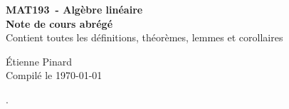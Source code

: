 \documentclass[11pt]{article}
\theoremstyle{plain}
\theoremstyle{definition}
\theoremstyle{remark}
\begin{document}
\shorthandoff{:}

\begin{titlepage}
    \centering
    \vspace*{3in}
    
    \vspace*{0.5cm}
    
    \huge
    \textmd{\textbf{MAT193\ - Algèbre linéaire}}\\
    \vspace{0.1in} \LARGE \textmd{\textbf{Note de cours abrégé}} \\
    \vspace{0.1in}\large{Contient toutes les définitions, théorèmes, lemmes et corollaires} 
    
    \vspace*{\fill}
    \large Étienne Pinard \\
    Compilé le \today
    
\end{titlepage}

\pagebreak

\tableofcontents

\setlength{\headheight}{14pt}.







\end{document}
